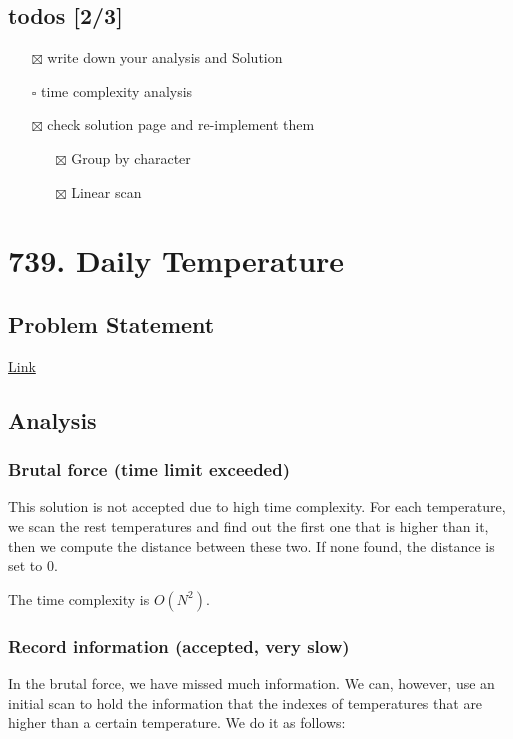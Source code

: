 \documentclass[11pt]{article}
\begin{document}
\subsection{todos [2/3]}
\label{sec:org436613e}
\begin{itemize}
\item[{$\boxtimes$}] write down your analysis and Solution
\item[{$\square$}] time complexity analysis
\item[{$\boxtimes$}] check solution page and re-implement them
\begin{itemize}
\item[{$\boxtimes$}] Group by character
\item[{$\boxtimes$}] Linear scan
\end{itemize}
\end{itemize}
\section{739. Daily Temperature}
\label{sec:org197c525}
\subsection{Problem Statement}
\label{sec:org89ba682}
\href{https://leetcode.com/problems/daily-temperatures/}{Link}
\subsection{Analysis}
\label{sec:org04d2110}
\subsubsection{Brutal force (time limit exceeded)}
\label{sec:org82e5412}
This solution is not accepted due to high time complexity. For each temperature, we scan the rest temperatures and find out the first one that is higher than it, then we compute the distance between these two. If none found, the distance is set to 0.

The time complexity is \(O(N^2)\).
\subsubsection{Record information (accepted, very slow)}
\label{sec:orgbd8336e}
In the brutal force, we have missed much information. We can, however, use an initial scan to hold the information that the indexes of temperatures that are higher than a certain temperature. We do it as follows:
\end{document}
